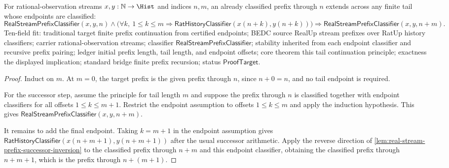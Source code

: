 \begin{theorem}
\label{thm:real-stream-prefix-classifier-tail-extension}
For rational-observation streams $x,y:\mathbb{N}\to\Hist$ and indices $n,m$,
an already classified prefix through $n$ extends across any finite tail whose
endpoints are classified:
$$
\mathsf{RealStreamPrefixClassifier}(x,y,n)\land
\bigl(\forall k,\ 1\le k\le m\Longrightarrow
\mathsf{RatHistoryClassifier}(x(n+k),y(n+k))\bigr)
\Longrightarrow
\mathsf{RealStreamPrefixClassifier}(x,y,n+m).
$$
Ten-field fit: traditional target finite prefix continuation from certified
endpoints; BEDC source RealUp stream prefixes over RatUp history classifiers;
carrier rational-observation streams; classifier
$\mathsf{RealStreamPrefixClassifier}$; stability inherited from each endpoint
classifier and recursive prefix pairing; ledger initial prefix length, tail
length, and endpoint offsets; core theorem this tail continuation principle;
exactness the displayed implication; standard bridge finite prefix recursion;
status $\mathsf{ProofTarget}$.
\end{theorem}
\begin{proof}
Induct on $m$. At $m=0$, the target prefix is the given prefix through $n$,
since $n+0=n$, and no tail endpoint is required.

For the successor step, assume the principle for tail length $m$ and suppose
the prefix through $n$ is classified together with endpoint classifiers for
all offsets $1\le k\le m+1$. Restrict the endpoint assumption to offsets
$1\le k\le m$ and apply the induction hypothesis. This gives
$\mathsf{RealStreamPrefixClassifier}(x,y,n+m)$.

It remains to add the final endpoint. Taking $k=m+1$ in the endpoint assumption
gives $\mathsf{RatHistoryClassifier}(x(n+m+1),y(n+m+1))$ after the usual
successor arithmetic. Apply the reverse direction of
\autoref{lem:real-stream-prefix-successor-inversion} to the classified prefix
through $n+m$ and this endpoint classifier, obtaining the classified prefix
through $n+m+1$, which is the prefix through $n+(m+1)$.
\end{proof}
